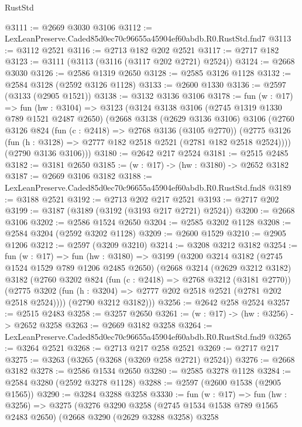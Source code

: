 \begin{lexlean}{RustStd}
\begin{coremodule}
@3111 := @2669 @3030 @3106
@3112 := LexLeanPreserve.Caded85d0ec70c96655a45904ef60abdb.R0.RustStd.fnd7
@3113 := @3112 @2521
@3116 := @2713 @182 @202 @2521
@3117 := @2717 @182
@3123 := @3111 (@3113 (@3116 (@3117 @202 @2721) @2524))
@3124 := @2668 @3030
@3126 := @2586 @1319 @2650
@3128 := @2585 @3126 @1128
@3132 := @2584 @3128 (@2592 @3126 @1128)
@3133 := @2600 @1330
@3136 := @2597 (@3133 (@2905 @1521))
@3138 := @3132 @3136 @3106
@3178 := fun (w : @17) =>
  fun (hw : @3104) =>
  @3123
    (@3124
      @3138
      @3106
      (@2745 @1319 @1330 @789 @1521 @2487 @2650)
      (@2668
        @3138
        (@2629 @3136 @3106)
        @3106
        (@2760
          @3126
          @824
          (fun (c : @2418) => @2768 @3136 (@3105 @2770))
          (@2775 @3126 (fun (h : @3128) => @2777 @182 @2518 @2521 (@2781 @182 @2518 @2524))))
        (@2790 @3136 @3106)))
@3180 := @2642 @217 @2524
@3181 := @2515 @2485
@3182 := @3181 @2650
@3185 := (w : @17) -> (hw : @3180) -> @2652 @3182
@3187 := @2669 @3106 @3182
@3188 := LexLeanPreserve.Caded85d0ec70c96655a45904ef60abdb.R0.RustStd.fnd8
@3189 := @3188 @2521
@3192 := @2713 @202 @217 @2521
@3193 := @2717 @202
@3199 := @3187 (@3189 (@3192 (@3193 @217 @2721) @2524))
@3200 := @2668 @3106
@3202 := @2586 @1524 @2650
@3204 := @2585 @3202 @1128
@3208 := @2584 @3204 (@2592 @3202 @1128)
@3209 := @2600 @1529
@3210 := @2905 @1206
@3212 := @2597 (@3209 @3210)
@3214 := @3208 @3212 @3182
@3254 := fun (w : @17) =>
  fun (hw : @3180) =>
  @3199
    (@3200
      @3214
      @3182
      (@2745 @1524 @1529 @789 @1206 @2485 @2650)
      (@2668
        @3214
        (@2629 @3212 @3182)
        @3182
        (@2760
          @3202
          @824
          (fun (c : @2418) => @2768 @3212 (@3181 @2770))
          (@2775 @3202 (fun (h : @3204) => @2777 @202 @2518 @2521 (@2781 @202 @2518 @2524))))
        (@2790 @3212 @3182)))
@3256 := @2642 @258 @2524
@3257 := @2515 @2483
@3258 := @3257 @2650
@3261 := (w : @17) -> (hw : @3256) -> @2652 @3258
@3263 := @2669 @3182 @3258
@3264 := LexLeanPreserve.Caded85d0ec70c96655a45904ef60abdb.R0.RustStd.fnd9
@3265 := @3264 @2521
@3268 := @2713 @217 @258 @2521
@3269 := @2717 @217
@3275 := @3263 (@3265 (@3268 (@3269 @258 @2721) @2524))
@3276 := @2668 @3182
@3278 := @2586 @1534 @2650
@3280 := @2585 @3278 @1128
@3284 := @2584 @3280 (@2592 @3278 @1128)
@3288 := @2597 (@2600 @1538 (@2905 @1565))
@3290 := @3284 @3288 @3258
@3330 := fun (w : @17) =>
  fun (hw : @3256) =>
  @3275
    (@3276
      @3290
      @3258
      (@2745 @1534 @1538 @789 @1565 @2483 @2650)
      (@2668
        @3290
        (@2629 @3288 @3258)
        @3258

\end{coremodule}
\end{lexlean}

